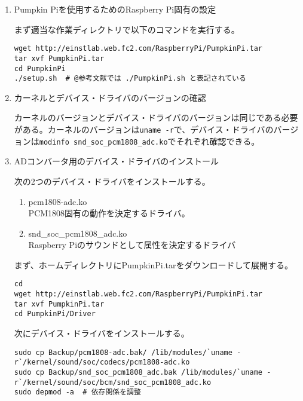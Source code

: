 \begin{enumerate}
\renewcommand{\labelenumi}{(\arabic{enumi})}
\item
  Pumpkin Piを使用するためのRaspberry Pi固有の設定

  まず適当な作業ディレクトリで以下のコマンドを実行する。

\begin{lstlisting}[caption=@TODO,label=@TODO]
wget http://einstlab.web.fc2.com/RaspberryPi/PumpkinPi.tar
tar xvf PumpkinPi.tar
cd PumpkinPi
./setup.sh  # @参考文献では ./PumpkinPi.sh と表記されている
\end{lstlisting}
\item
  カーネルとデバイス・ドライバのバージョンの確認

  カーネルのバージョンとデバイス・ドライバのバージョンは同じである必要がある。カーネルのバージョンは\texttt{uname\ -r}で、デバイス・ドライバのバージョンは\texttt{modinfo\ snd\_soc\_pcm1808_adc.ko}でそれぞれ確認できる。
\item
  ADコンバータ用のデバイス・ドライバのインストール

  次の2つのデバイス・ドライバをインストールする。

  \begin{enumerate}
  \def\labelenumii{\arabic{enumii}.}
  \tightlist
  \item
    pcm1808-adc.ko\\
    PCM1808固有の動作を決定するドライバ。
  \item
    snd\_soc\_pcm1808\_adc.ko\\
    Raspberry Piのサウンドとして属性を決定するドライバ
  \end{enumerate}

  まず、ホームディレクトリにPumpkinPi.tarをダウンロードして展開する。

\begin{lstlisting}[caption=@TODO,label=@TODO]
cd 
wget http://einstlab.web.fc2.com/RaspberryPi/PumpkinPi.tar
tar xvf PumpkinPi.tar
cd PumpkinPi/Driver
\end{lstlisting}

  次にデバイス・ドライバをインストールする。

\begin{lstlisting}[caption=@TODO,label=@TODO]
sudo cp Backup/pcm1808-adc.bak/ /lib/modules/`uname -r`/kernel/sound/soc/codecs/pcm1808-adc.ko
sudo cp Backup/snd_soc_pcm1808_adc.bak /lib/modules/`uname -r`/kernel/sound/soc/bcm/snd_soc_pcm1808_adc.ko
sudo depmod -a  # 依存関係を調整
\end{lstlisting}


\end{enumerate}
